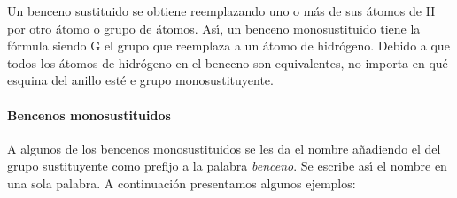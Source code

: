 Un benceno sustituido se obtiene reemplazando uno o m\'as de sus \'atomos de H por otro \'atomo o grupo de \'atomos. As\'{\i}, un benceno monosustituido tiene la f\'ormula  siendo G el grupo que reemplaza a un \'atomo de hidr\'ogeno. Debido a que todos los \'atomos de hidr\'ogeno en el benceno son equivalentes, no importa en qu\'e esquina del anillo est\'e e grupo monosustituyente.

\paragraph{Bencenos monosustituidos} A algunos de los bencenos monosustituidos se les da el nombre a\~nadiendo el del grupo sustituyente como prefijo a la palabra \textit{benceno}. Se escribe as\'{\i} el nombre en una sola palabra. A continuaci\'on  
presentamos algunos ejemplos:

